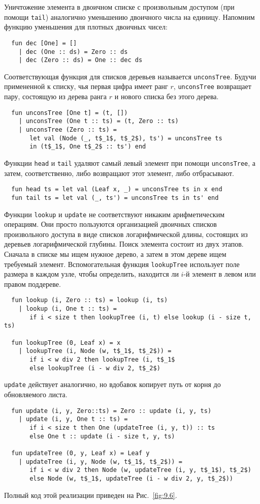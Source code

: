 Уничтожение элемента в двоичном списке с произвольным доступом (при
помощи \lstinline!tail!) аналогично уменьшению двоичного числа на
единицу. Напомним функцию уменьшения для плотных двоичных чисел:
\begin{lstlisting}
  fun dec [One] = []
    | dec (One :: ds) = Zero :: ds
    | dec (Zero :: ds) = One :: dec ds
\end{lstlisting}
Соответствующая функция для списков деревьев называется
\lstinline!unconsTree!. Будучи примененной к списку, чья первая цифра
имеет ранг $r$, \lstinline!unconsTree! возвращает пару, состоящую из
дерева ранга $r$ и нового списка без этого дерева.
\begin{lstlisting}
  fun unconsTree [One t] = (t, [])
    | unconsTree (One t :: ts) = (t, Zero :: ts)
    | unconsTree (Zero :: ts) = 
       let val (Node (_, t$_1$, t$_2$), ts') = unconsTree ts
       in (t$_1$, One t$_2$ :: ts') end
\end{lstlisting}
Функции \lstinline!head! и \lstinline!tail!  удаляют самый левый
элемент при помощи \lstinline!unconsTree!, а затем, соответственно,
либо возвращают этот элемент, либо отбрасывают.
\begin{lstlisting}
  fun head ts = let val (Leaf x, _) = unconsTree ts in x end
  fun tail ts = let val (_, ts') = unconsTree ts in ts' end
\end{lstlisting}

Функции \lstinline!lookup! и \lstinline!update! не соответствуют
никаким арифметическим операциям. Они просто пользуются организацией
двоичных списков произвольного доступа в виде списков логарифмической
длины, состоящих из деревьев логарифмической глубины. Поиск элемента
состоит из двух этапов. Сначала в списке мы ищем нужное дерево, а
затем в этом дереве ищем требуемый элемент. Вспомогательная функция
\lstinline!lookupTree! использует поле размера в каждом узле, чтобы
определить, находится ли $i$-й элемент в левом или правом
поддереве.
\begin{lstlisting}
  fun lookup (i, Zero :: ts) = lookup (i, ts)
    | lookup (i, One t :: ts) =
       if i < size t then lookupTree (i, t) else lookup (i - size t, ts)

  fun lookupTree (0, Leaf x) = x
    | lookupTree (i, Node (w, t$_1$, t$_2$)) =
       if i < w div 2 then lookupTree (i, t$_1$
       else lookupTree (i - w div 2, t$_2$)
\end{lstlisting}
\lstinline!update! действует аналогично, но вдобавок копирует путь от
корня до обновляемого листа.
\begin{lstlisting}
  fun update (i, y, Zero::ts) = Zero :: update (i, y, ts)
    | update (i, y, One t :: ts) =
       if i < size t then One (updateTree (i, y, t)) :: ts
       else One t :: update (i - size t, y, ts)

  fun updateTree (0, y, Leaf x) = Leaf y
    | updateTree (i, y, Node (w, t$_1$, t$_2$)) =
       if i < w div 2 then Node (w, updateTree (i, y, t$_1$), t$_2$)
       else Node (w, t$_1$, updateTree (i - w div 2, y, t$_2$))
\end{lstlisting}
Полный код этой реализации приведен на Рис.~\ref{fig:9.6}.

